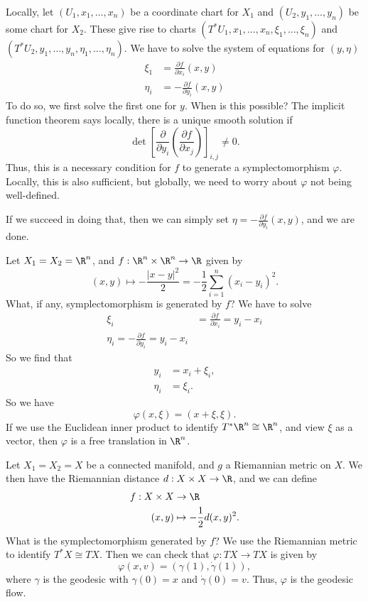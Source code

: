\documentclass[a4paper]{article}
\begin{document}
\begin{eg}
  Locally, let $(U_1, x_1, \ldots, x_n)$ be a coordinate chart for $X_1$ and $(U_2, y_1, \ldots, y_n)$ be some chart for $X_2$. These give rise to charts $(T^* U_1, x_1, \ldots, x_n, \xi_1, \ldots, \xi_n)$ and $(T^* U_2, y_1, \ldots, y_n, \eta_1, \ldots, \eta_n)$. We have to solve the system of equations for $(y, \eta)$
  \begin{align*}
    \xi_1 &= \frac{\partial f}{\partial x_i} (x, y)\\
    \eta_i &= - \frac{\partial f}{\partial y_i} (x, y)
  \end{align*}
  To do so, we first solve the first one for $y$. When is this possible? The implicit function theorem says locally, there is a unique smooth solution if
  \[
    \det \left[\frac{\partial}{\partial y_i}\left(\frac{\partial f}{\partial x_j}\right)\right]_{i, j} \not= 0.
  \]
  Thus, this is a necessary condition for $f$ to generate a symplectomorphism $\varphi$. Locally, this is also sufficient, but globally, we need to worry about $\varphi$ not being well-defined.

  If we succeed in doing that, then we can simply set $\eta = - \frac{\partial f}{\partial y_i} (x, y)$, and we are done.
\end{eg}

\begin{eg}
  Let $X_1 = X_2 = \R^n$, and $f: \R^n \times \R^n \to \R$ given by
  \[
    (x, y) \mapsto - \frac{|x - y|^2}{2} = -\frac{1}{2} \sum_{i = 1}^n (x_i - y_i)^2.
  \]
  What, if any, symplectomorphism is generated by $f$? We have to solve
  \begin{align*}
    \xi_i &= \frac{\partial f}{\partial x_i} = y_i - x_i\\
    \eta_i = -\frac{\partial f}{\partial y_i} = y_i - x_i
  \end{align*}
  So we find that
  \begin{align*}
    y_i &= x_i + \xi_i,\\
    \eta_i &= \xi_i.
  \end{align*}
  So we have
  \[
    \varphi(x, \xi) = (x + \xi, \xi).
  \]
  If we use the Euclidean inner product to identify $T^* \R^n \cong \R^n$, and view $\xi$ as a vector, then $\varphi$ is a free translation in $\R^n$.
\end{eg}

\begin{eg}
  Let $X_1 = X_2 = X$ be a connected manifold, and $g$ a Riemannian metric on $X$. We then have the Riemannian distance $d: X \times X \to \R$, and we can define
  \begin{align*}
    f: X \times X &\to \R\\
    (x, y) &\mapsto - \frac{1}{2} d(x, y)^2.
  \end{align*}
  What is the symplectomorphism generated by $f$? We use the Riemannian metric to identify $T^*X \cong TX$. Then we can check that $\varphi: TX \to TX$ is given by
  \[
    \varphi(x, v) = (\gamma(1), \dot{\gamma}(1)),
  \]
  where $\gamma$ is the geodesic with $\gamma(0) = x$ and $\dot{\gamma}(0) = v$. Thus, $\varphi$ is the geodesic flow.
\end{eg}
\end{document}
